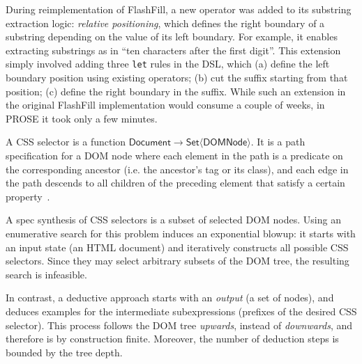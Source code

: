 \begin{scenario}
    During reimplementation of FlashFill, a new operator was added to its substring extraction logic: \emph{relative
    positioning},
    which defines the right boundary of a substring depending on the value of its left boundary.
    For example, it enables extracting substrings as in ``ten characters after the first digit''.
    This extension simply involved adding three \texttt{let} rules in the DSL, which (a) define the left boundary
    position using existing operators; (b) cut the suffix starting from that position; (c) define the right boundary in
    the suffix.
    While such an extension in the original FlashFill implementation would consume a couple of weeks, in PROSE it
    took only a few minutes.
\end{scenario}

\begin{scenario}
    A CSS selector is a function $\mathsf{Document} \to \mathsf{Set}\langle \mathsf{DOMNode}\rangle$.
    It is a path specification for a DOM node where each element in the path is a predicate on the corresponding
    ancestor (i.e.  the ancestor's tag or its class), and each edge in the path descends to all children of the
    preceding element that satisfy a certain property~\cite{css3selectors}.

    A spec synthesis of CSS selectors is a subset of selected DOM nodes.
    Using an enumerative search for this problem induces an exponential blowup: it starts with an input state (an HTML
    document) and iteratively constructs all possible CSS selectors.
    Since they may select arbitrary subsets of the DOM tree, the resulting search is infeasible.

    In contrast, a deductive approach starts with an \emph{output} (a set of nodes), and deduces examples for the
    intermediate subexpressions (prefixes of the desired CSS selector).
    This process follows the DOM tree \emph{upwards}, instead of \emph{downwards}, and therefore is by construction
    finite.
    Moreover, the number of deduction steps is bounded by the tree depth.
\end{scenario}

